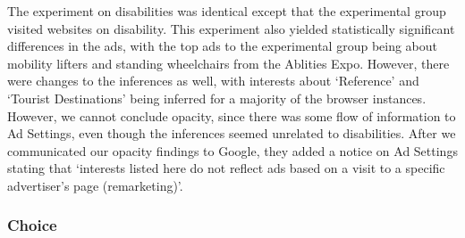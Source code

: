 \documentclass[10pt, onecolumn]{report}
\begin{document}
The experiment on disabilities was identical except that the experimental group
visited websites on disability. This experiment also yielded statistically 
significant differences in the ads, 
with the top ads to the experimental group being about mobility lifters 
and standing wheelchairs from the Ablities Expo. 
However, there were changes to the inferences as well, with interests about `Reference'
and `Tourist Destinations' being inferred for a majority of the browser instances. 
However, we cannot conclude opacity, since 
there was some flow of information to Ad Settings, even though the inferences
seemed unrelated to disabilities. After we communicated
our opacity findings to Google, they added a notice on Ad Settings stating that 
`interests listed here do not reflect ads based on a visit to a specific advertiser's page 
(remarketing)'. 


\subsubsection{Choice}
\end{document}
